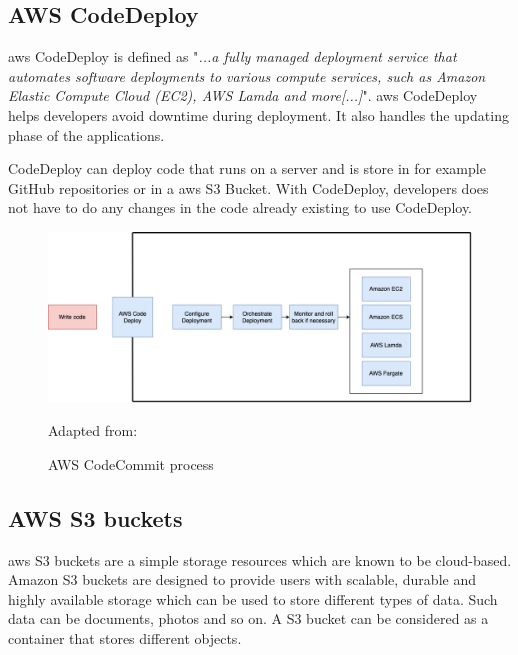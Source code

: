 \newpage
\subsection{AWS CodeDeploy}
\acrshort{aws} CodeDeploy is defined as "\textit{...a fully managed deployment service that automates software deployments to various compute services, such as Amazon Elastic Compute Cloud (EC2), AWS Lamda and more[...]}"\cite{AWSCodeDeploy}.
\acrshort{aws} CodeDeploy helps developers avoid downtime during deployment. It also handles the updating phase of the applications. 

CodeDeploy can deploy code that runs on a server and is store in for example GitHub repositories or in a \acrshort{aws} S3 Bucket. With CodeDeploy, developers does not have to do any changes in the code already existing to use CodeDeploy. \cite{CodeDeploy1}

\begin{figure}[H]
    \centering
    \includegraphics[scale=0.4]{Images/AWSCodeDeploy.png}
    \caption{AWS CodeCommit process} Adapted from: \cite{CodeDeploy1}
    \label{fig:AWS CodeDeploy Process}
\end{figure}


\subsection{AWS S3 buckets}
\acrshort{aws} S3 buckets are a simple storage resources which are known to be  cloud-based. Amazon S3 buckets are designed to provide users with scalable, durable and highly available storage which can be used to store different types of data. Such data can be documents, photos and so on. A S3 bucket can be considered as a container that stores different objects. \cite{S3Bucket}